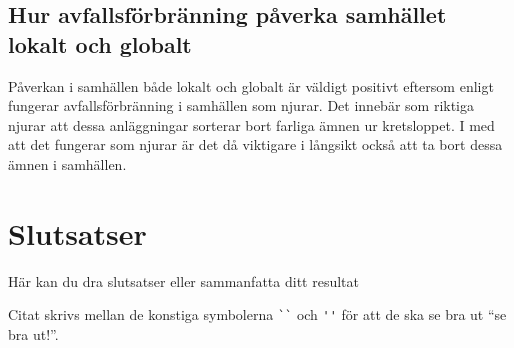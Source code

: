 \documentclass[11p]{article}
\begin{document}
    \subsection{Hur avfallsförbränning påverka samhället lokalt och globalt}
    Påverkan i samhällen både lokalt och globalt är väldigt positivt eftersom enligt \textcite{stockholmenergi} fungerar avfallsförbränning i samhällen som njurar.
    Det innebär som riktiga njurar att dessa anläggningar sorterar bort farliga ämnen ur kretsloppet.
    I med att det fungerar som njurar är det då viktigare i långsikt också att ta bort dessa ämnen i samhällen.

    \section{Slutsatser}
    Här kan du dra slutsatser eller sammanfatta ditt resultat

    Citat skrivs mellan de konstiga symbolerna \verb|``| och \verb|''| för att de ska se bra ut ``se bra ut!''.


    \printbibliography
\end{document}
